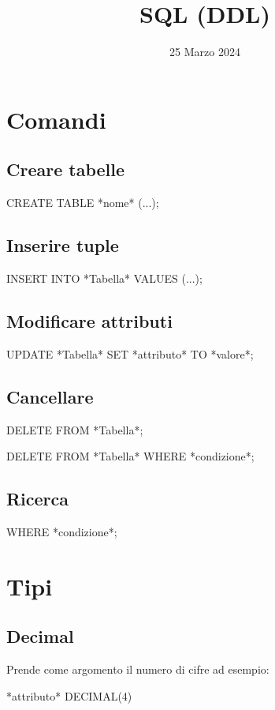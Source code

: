 \documentclass[12pt]{report}
\title{SQL (DDL)}
\date{25 Marzo 2024}
\begin{document}
\maketitle
\tableofcontents
\chapter{Comandi}
\section{Creare tabelle}
\begin{spverbatim}
    CREATE TABLE *nome* (...);
\end{spverbatim}
\section{Inserire tuple}
\begin{spverbatim}
    INSERT INTO *Tabella* VALUES (...);
\end{spverbatim}
\section{Modificare attributi}
\begin{spverbatim}
    UPDATE *Tabella* SET *attributo* TO *valore*;
\end{spverbatim}
\section{Cancellare}
\begin{spverbatim}
    DELETE FROM *Tabella*; %

    DELETE FROM *Tabella* WHERE *condizione*;
\end{spverbatim}
\section{Ricerca}
\begin{spverbatim}
    WHERE *condizione*;
\end{spverbatim}
\chapter{Tipi}
\section{Decimal}
Prende come argomento il numero di cifre ad esempio:
\begin{spverbatim}
    *attributo* DECIMAL(4) %
\end{spverbatim}
\end{document}

